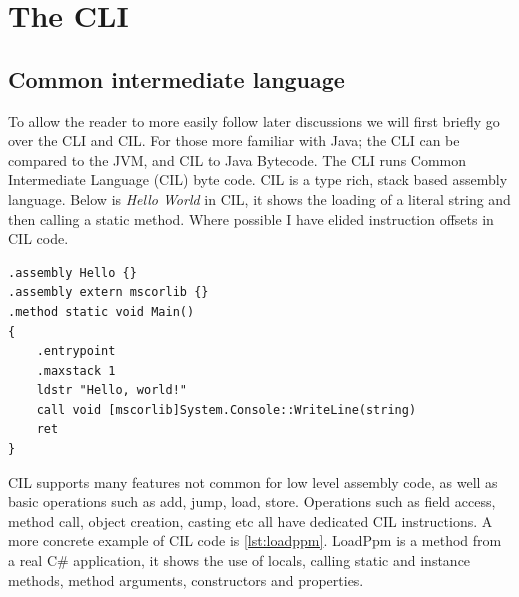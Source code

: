 \documentclass[english]{report}
\begin{document}
\section{The CLI}


\subsection{Common intermediate language}

To allow the reader to more easily follow later discussions we will
first briefly go over the CLI and CIL. For those more familiar with
Java; the CLI can be compared to the JVM, and CIL to Java Bytecode.
The CLI runs Common Intermediate Language (CIL) byte code. CIL is
a type rich, stack based assembly language. Below is \emph{Hello World}
in CIL, it shows the loading of a literal string and then calling
a static method. Where possible I have elided instruction offsets
in CIL code.

\begin{lstlisting}[caption={Hello world},language=cil]
.assembly Hello {} 
.assembly extern mscorlib {} 
.method static void Main() 
{     
	.entrypoint     
	.maxstack 1     
	ldstr "Hello, world!"     
	call void [mscorlib]System.Console::WriteLine(string)     
	ret 
}
\end{lstlisting}


CIL supports many features not common for low level assembly code, as well as
basic operations such as add, jump, load, store. Operations such as field
access, method call, object creation, casting etc all have dedicated CIL
instructions. A more concrete example of CIL code is \ref{lst:loadppm}. LoadPpm
is a method from a real C\# application, it shows the use of locals, calling
static and instance methods, method arguments, constructors and properties. 
\end{document}
